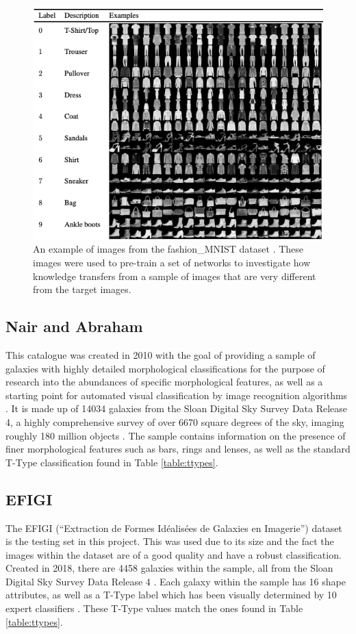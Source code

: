 \documentclass[12pt, onecolumn]{aa}
\begin{document}
\begin{figure}[h!]
\centering
        \includegraphics[width=0.7\linewidth]{Figures/fashion_mnist.png}
        \caption{An example of images from the fashion\_MNIST dataset \citep{fashion_mnist}. These images were used to pre-train a set of networks to investigate how knowledge transfers from a sample of images that are very different from the target images.}
        \label{fig:fashion_mnist}
\end{figure}
 \subsection{Nair and Abraham}\label{sec:nandabrah}
 This catalogue was created in 2010 with the goal of providing a sample of galaxies with highly detailed morphological classifications for the purpose of research into the abundances of specific morphological features, as well as a starting point for automated visual classification by image recognition algorithms \citep{nairandabraham}. It is made up of 14034 galaxies from the Sloan Digital Sky Survey Data Release 4, a highly comprehensive survey of over 6670 square degrees of the sky, imaging roughly 180 million objects \citep{sdssdr4}. The sample contains information on the presence of finer morphological features such as bars, rings and lenses, as well as the standard T-Type classification found in Table \ref{table:ttypes}.
 
 
\subsection{EFIGI}\label{sec:efigi}
The EFIGI (“Extraction de Formes Id\'{e}alis\'{e}es de
Galaxies en Imagerie”) dataset is the testing set in this project. This was used due to its size and the fact the images within the dataset are of a good quality and have a robust classification. Created in 2018, there are 4458 galaxies within the sample, all from the Sloan Digital Sky Survey Data Release 4 \citep{sdssdr4}. Each galaxy within the sample has 16 shape attributes, as well as a T-Type label which has been visually determined by 10 expert classifiers \citep{EFIGI2018}. These T-Type values match the ones found in Table \ref{table:ttypes}. 
\end{document}
